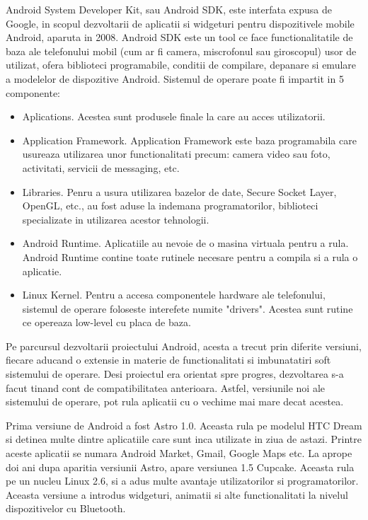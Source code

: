 	Android System Developer Kit, sau Android SDK, este interfata expusa de Google, in scopul dezvoltarii de aplicatii si widgeturi pentru dispozitivele mobile Android, aparuta in 2008. Android SDK este un tool ce face  functionalitatile de baza ale telefonului mobil (cum ar fi camera, miscrofonul sau giroscopul) usor de utilizat, ofera biblioteci programabile, conditii de compilare, depanare si emulare a modelelor de dispozitive Android. 
	Sistemul de operare poate fi impartit in 5 componente:
	\begin{itemize}
		\item Aplications. Acestea sunt produsele finale la care au acces utilizatorii.
		
		
		\item Application Framework. Application Framework este baza programabila care usureaza utilizarea unor functionalitati precum: camera video sau foto, activitati, servicii de messaging, etc.
		
		\item Libraries. Penru a usura utilizarea bazelor de date, Secure Socket Layer, OpenGL, etc., au fost aduse la indemana programatorilor, biblioteci specializate in utilizarea acestor tehnologii.
		
		\item Android Runtime. Aplicatiile au nevoie de o masina virtuala pentru a rula. Android Runtime contine toate rutinele necesare pentru a compila si a rula o aplicatie.
		
		\item Linux Kernel. Pentru a accesa componentele hardware ale telefonului, sistemul de operare foloseste interefete numite "drivers". Acestea sunt rutine ce opereaza low-level cu placa de baza.
	\end{itemize}
	
	\vfill
	
	Pe parcursul dezvoltarii proiectului Android, acesta a trecut prin diferite versiuni, fiecare aducand o extensie in materie de functionalitati si imbunatatiri soft sistemului de operare. Desi proiectul era orientat spre progres, dezvoltarea s-a facut tinand cont de compatibilitatea anterioara. Astfel, versiunile noi ale sistemului de operare, pot rula aplicatii cu o vechime mai mare decat acestea.
	
	Prima versiune de Android a fost Astro 1.0. Aceasta rula pe modelul HTC Dream si detinea multe dintre aplicatiile care sunt inca utilizate in ziua de astazi. Printre aceste aplicatii se numara Android Market, Gmail, Google Maps etc.
	La aprope doi ani dupa aparitia versiunii Astro, apare versiunea 1.5 Cupcake. Aceasta rula pe un nucleu Linux 2.6, si a adus multe avantaje utilizatorilor si programatorilor. Aceasta versiune a introdus widgeturi, animatii si alte functionalitati la nivelul dispozitivelor cu Bluetooth.
	\newline
	
